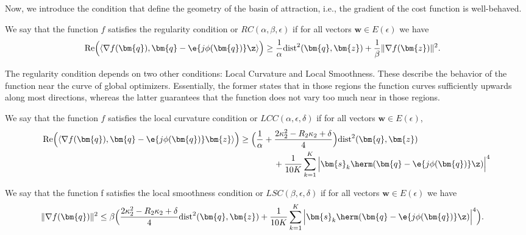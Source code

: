Now, we introduce the condition that define the geometry of the basin of attraction, i.e., the gradient of the cost function is well-behaved.

\begin{cond} \label{cond:regularity_condition}
	We say that the function $f$ satisfies the regularity condition or $RC(\alpha, \beta, \epsilon)$ if for all vectors $\bm{w}\in E(\epsilon)$ we have
	\begin{align}
	&\mathrm{Re}\Big( \langle\nabla f(\bm{q}), \bm{q} - \e{j\phi(\bm{q})}\z\rangle\Big) \geq\frac{1}{\alpha}\mathrm{dist}^2(\bm{q},\bm{z}) + \frac{1}{\beta}\|\nabla f(\bm{z})\|^2. \label{eqn:regularity_condition}
	\end{align}
\end{cond}

The regularity condition depends on two other conditions: Local Curvature and Local Smoothness. These describe the behavior of the function near the curve of global optimizers. Essentially, the former states that in those regions the function curves sufficiently upwards along most directions, whereas the latter guarantees that the function does not vary too much near in those regions.

\begin{cond} \label{cond:lcc}
	We say that the function $f$ satisfies the local
	curvature condition or $LCC(\alpha, \epsilon, \delta)$ if for all vectors $\bm{w}\in E(\epsilon)$,
	\begin{align}
	\mathrm{Re}\Big( \langle\nabla f(\bm{q}), \bm{q} - \e{j\phi(\bm{q})}\bm{z}\rangle\Big)
	&\geq\Big(\frac{1}{\alpha}+\frac{2\kappa_2^2-R_2\kappa_2+\delta}{4}\Big)\mathrm{dist}^2(\bm{q},\bm{z}) 
	\nonumber\\&\qquad\qquad
	+ \frac{1}{10K}\sum_{k=1}^K \Big|\bm{s}_k\herm(\bm{q} - \e{j\phi(\bm{q})}\z)\Big|^4
	\end{align} \label{eqn:llc}
\end{cond}

\begin{cond} \label{cond:lsc}
	We say that the function f satisfies the local
	smoothness condition or $LSC(\beta, \epsilon, \delta)$ if for all vectors $\bm{w}\in E(\epsilon)$ we have
	\begin{align}
	&\|\nabla f(\bm{q}) \|^2 \leq \beta\Big(\frac{2\kappa_2^2-R_2\kappa_2+\delta}{4}\mathrm{dist}^2(\bm{q},\bm{z})
	+ \frac{1}{10K}\sum_{k=1}^K \Big|\bm{s}_k\herm(\bm{q} - \e{j\phi(\bm{q})}\z)\Big|^4\Big).
	\end{align}\label{eqn:lsc}
\end{cond}

